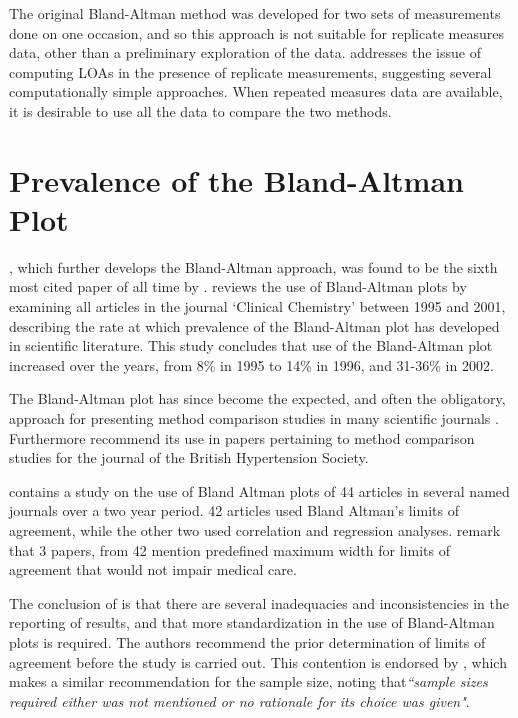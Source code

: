 \documentclass[12pt, a4paper]{report}
\theoremstyle{plain}
\theoremstyle{definition}
\theoremstyle{remark}
\begin{document}
The original Bland-Altman method was developed for two sets of measurements done on one occasion, and so this approach is not suitable for replicate measures data, other than a preliminary exploration of the data. \citet{BA99} addresses the issue of computing LOAs in the presence of replicate measurements, suggesting several computationally simple approaches. When repeated measures data are available, it is desirable to use all the data to compare the two methods. 




\section{Prevalence of the Bland-Altman Plot}

\citet*{BA86}, which further develops the Bland-Altman approach,
was found to be the sixth most cited paper of all time by \citet{BAcite}. \cite{Dewitte} reviews the use of Bland-Altman plots by examining all articles in the journal `Clinical Chemistry' between 1995 and 2001, describing the rate at which
prevalence of the Bland-Altman plot has developed in scientific
literature. This study concludes that use of the Bland-Altman plot increased over the years, from 8\% in 1995 to
14\% in 1996, and 31-36\% in 2002.

The Bland-Altman plot has since become the expected, and often the obligatory, approach for presenting method comparison
studies in many scientific journals \citep{hollis}. Furthermore \citet{BritHypSoc} recommend its use in papers pertaining to
method comparison studies for the journal of the British Hypertension Society.


\citet{mantha} contains a study on the use of Bland Altman plots of 44 articles in several named journals over a two year period. 42 articles used Bland Altman's limits of agreement, while the other two used correlation and regression analyses. \citet{mantha} remark that 3 papers, from 42 mention predefined maximum width for limits of agreement that would not impair medical care.

The conclusion of \citet{mantha} is that there are several inadequacies and inconsistencies in the reporting of results, and
that more standardization in the use of Bland-Altman plots is required. The authors recommend the prior determination of limits of agreement before the study is carried out. This contention is endorsed by \citet{lin}, which makes a similar recommendation for the sample size, noting that\emph{``sample sizes required either was not mentioned or no rationale for its choice was given"}.
\end{document}
